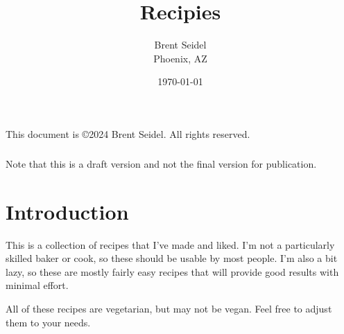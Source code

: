 \documentclass[10pt, openany]{book}
\title{Recipies}
\author{Brent Seidel \\ Phoenix, AZ}
\date{ \today }
\begin{document}
%
%
\pagestyle{myfancy}
%
%
\frontmatter
\maketitle
\begin{center}
This document is \copyright 2024 Brent Seidel.  All rights reserved.

\paragraph{}Note that this is a draft version and not the final version for publication.
\end{center}
\tableofcontents

\mainmatter

\chapter{Introduction}
This is a collection of recipes that I've made and liked.  I'm not a particularly skilled baker or cook, so these should be usable by most people.  I'm also a bit lazy, so these are mostly fairly easy recipes that will provide good results with minimal effort.

All of these recipes are vegetarian, but may not be vegan.  Feel free to adjust them to your needs.
\end{document}
